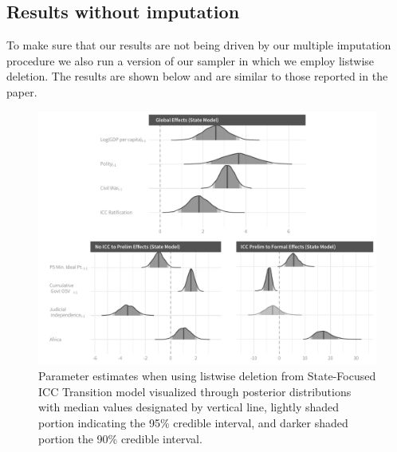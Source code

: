 \subsection*{Results without imputation}

To make sure that our results are not being driven by our multiple imputation procedure we also run a version of our sampler in which we employ listwise deletion. The results are shown below and are similar to those reported in the paper.


\begin{figure}
    \centering
    \includegraphics[width=1\textwidth]{stateCoefSumm_noImp.pdf}
    \caption{Parameter estimates when using listwise deletion from State-Focused ICC Transition model visualized through posterior distributions with median values designated by vertical line, lightly shaded portion indicating the 95\% credible interval, and darker shaded portion the 90\% credible interval.}
    \label{fig:stateModel_noImp}
\end{figure}


